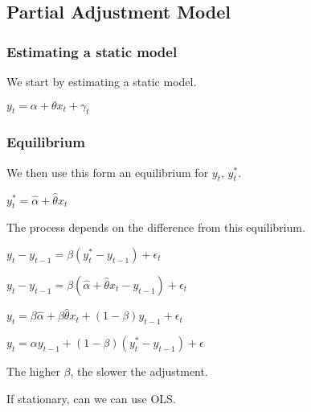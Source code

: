 
\subsection{Partial Adjustment Model}

\subsubsection{Estimating a static model}

We start by estimating a static model.

\(y_t=\alpha + \theta x_t + \gamma_t\)

\subsubsection{Equilibrium}

We then use this form an equilibrium for \(y_t\), \(y_t^*\).

\(y_t^*=\hat \alpha + \hat \theta x_t \)

The process depends on the difference from this equilibrium.

\(y_t-y_{t-1}=\beta (y_{t}^*-y_{t-1})+\epsilon_t \)

\(y_t-y_{t-1}=\beta (\hat \alpha + \hat \theta x_t -y_{t-1})+\epsilon_t \)

\(y_t=\beta \hat \alpha + \beta \hat \theta x_t + (1-\beta )y_{t-1}+\epsilon_t \)

\(y_t=\alpha y_{t-1}+(1-\beta )(y_{t}^*-y_{t-1})+\epsilon \)

The higher \(\beta \), the slower the adjustment.

If stationary, can we can use OLS.

